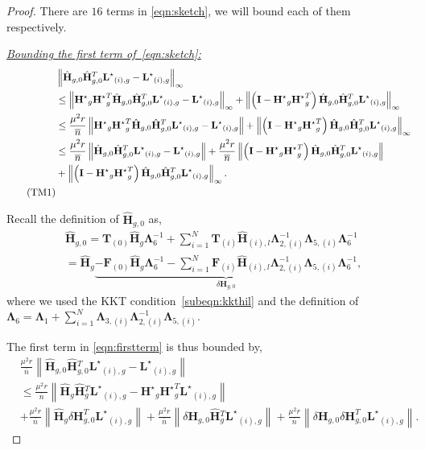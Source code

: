 \documentclass[twoside,11pt]{article}
\newcommand{\norm}[1]{\left\lVert#1\right\rVert}
\newcommand{\matF}{\mathbf{F}}
\newcommand{\hmatH}{{\hat{\mathbf{H}}}{}}
\newcommand{\matHst}{{\mathbf{H}^\star}}
\newcommand{\matI}{\mathbf{I}}
\newcommand{\matLst}{{\mathbf{L}^\star}}
\newcommand{\matT}{\mathbf{T}}
\newcommand{\matLambda}{\mathbf{\Lambda}}
\newcommand{\dtmatH}{\delta\mathbf{H}}
\newcommand{\murnb}{\frac{\mu^2 r}{\overline{n}}}
\begin{document}
\begin{proof}
There are $16$ terms in \eqref{eqn:sketch}, we will bound each of them respectively.

\noindent\underline{\it Bounding the first term of~\eqref{eqn:sketch}:}
\begin{align}
&\norm{\hmatH_{g,0}\hmatH_{g,0}^T\matLst_{(i),g}-\matLst_{(i),g}}_{\infty}\notag\\
&\le\norm{\matHst_{g}\matHst_{g}^T\hmatH_{g,0}\hmatH_{g,0}^T\matLst_{(i),g}-\matLst_{(i),g}}_{\infty}+\norm{\left(\matI-\matHst_{g}\matHst_{g}^T\right)\hmatH_{g,0}\hmatH_{g,0}^T\matLst_{(i),g}}_{\infty}\notag\\
&\le \murnb\norm{\matHst_{g}\matHst_{g}^T\hmatH_{g,0}\hmatH_{g,0}^T\matLst_{(i),g}-\matLst_{(i),g}}+ \norm{\left(\matI-\matHst_{g}\matHst_{g}^T\right)\hmatH_{g,0}\hmatH_{g,0}^T\matLst_{(i),g}}_{\infty}\notag\\
&\le \murnb\norm{\hmatH_{g,0}\hmatH_{g,0}^T\matLst_{(i),g}-\matLst_{(i),g}}+\murnb\norm{\left(\matI-\matHst_{g}\matHst_{g}^T\right)\hmatH_{g,0}\hmatH_{g,0}^T\matLst_{(i),g}}\notag\\
&+\norm{\left(\matI-\matHst_{g}\matHst_{g}^T\right)\hmatH_{g,0}\hmatH_{g,0}^T\matLst_{(i),g}}_{\infty}.\notag\\
\label{eqn:firstterm}\tag{TM1}
\end{align}

Recall the definition of $\hmatH_{g,0}$ as,
\begin{align*}
&\hmatH_{g,0} = \matT_{(0)}\hmatH_g\matLambda_6^{-1}+\sum_{i=1}^N
\matT_{(i)}\hmatH_{(i),l}\matLambda_{2,(i)}^{-1}\matLambda_{5,(i)}\matLambda_6^{-1}\\
&=\hmatH_g\underbrace{-\matF_{(0)}\hmatH_g\matLambda_6^{-1}-\sum_{i=1}^N
\matF_{(i)}\hmatH_{(i),l}\matLambda_{2,(i)}^{-1}\matLambda_{5,(i)}\matLambda_6^{-1}}_{\dtmatH_{g,0}   },
\end{align*}
where we used the KKT condition~\eqref{subeqn:kkthil} and the definition of $\matLambda_6=\matLambda_1+\sum_{i=1}^N\matLambda_{3,(i)}\matLambda_{2,(i)}^{-1}\matLambda_{5,(i)}$.

The first term in \eqref{eqn:firstterm} is thus bounded by,
\begin{align*}
&\murnb\norm{\hmatH_{g,0}\hmatH_{g,0}^T\matLst_{(i),g}-\matLst_{(i),g}}\\
&\le \murnb\norm{\hmatH_{g}\hmatH_{g}^T\matLst_{(i),g}-\matHst_{g}\matHst_{g}^T\matLst_{(i),g}}\\
&+\murnb\norm{\hmatH_{g}\dtmatH_{g,0}^T\matLst_{(i),g}}+\murnb\norm{\dtmatH_{g,0}\hmatH_{g}^T\matLst_{(i),g}}+\murnb\norm{\dtmatH_{g,0}\dtmatH_{g,0}^T\matLst_{(i),g}}.
\label{eqn:firstfirstterm}
\end{align*}


\end{proof}
\end{document}
